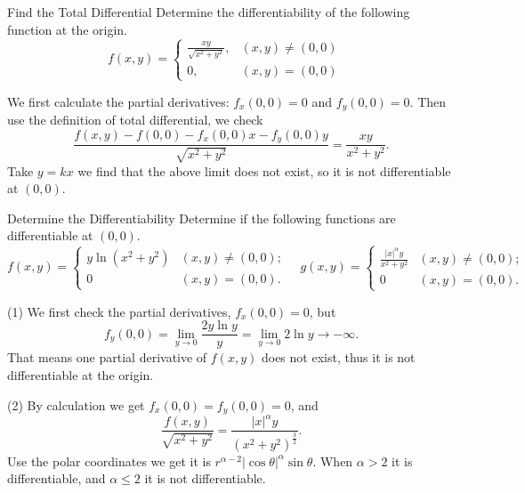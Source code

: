 \begin{example}{Find the Total Differential}{}
  Determine the differentiability of the following function at the origin.
  \begin{equation}
    f(x,y)=\begin{cases}\frac{xy}{\sqrt{x^2+y^2}},&(x,y)\neq(0,0)\\0,&(x,y)=(0,0)\end{cases} \quad
  \end{equation}
\end{example}

\begin{solution}
  We first calculate the partial derivatives: $f_x(0, 0) = 0$ and $f_y(0, 0) = 0$.
  Then use the definition of total differential, we check
  \begin{equation}
    \frac{f(x, y) - f(0, 0) - f_x(0, 0) x - f_y(0, 0)y}{\sqrt{x^2 + y^2}}
    = \frac{xy}{x^2 + y^2}.
  \end{equation}
  Take $y = kx$ we find that the above limit does not exist,
  so it is not differentiable at $(0, 0)$.
\end{solution}

\begin{example}{Determine the Differentiability}{}
  Determine if the following functions are differentiable at $(0, 0)$.
  \begin{equation}
    f(x, y) =
    \begin{cases}
      y \ln (x^2 + y^2) & (x, y) \neq (0, 0);\\
      0 & (x, y) = (0, 0).
    \end{cases}
    \quad
    g(x, y) =
    \begin{cases}
      \frac{|x|^{\alpha} y}{x^2 + y^2} & (x, y) \neq (0, 0);\\
      0 & (x, y) = (0, 0).
    \end{cases}
  \end{equation}
\end{example}

\begin{solution}
  (1) We first check the partial derivatives,
  $f_x(0, 0) = 0$, but
  \begin{equation}
    f_y(0, 0) = \lim \limits _{y \rightarrow 0} \frac{2y\ln y}{y} = \lim \limits _{y \rightarrow 0} 2 \ln y \rightarrow - \infty.
  \end{equation}
  That means one partial derivative of $f(x, y)$ does not exist, thus it is not
  differentiable at the origin.

  (2) By calculation we get $f_x(0, 0) = f_y(0, 0) = 0$, and
  \begin{equation}
    \frac{f(x, y)}{\sqrt{x^2 + y^2}} = \frac{|x|^{\alpha} y}{(x^2 + y^2)^{\frac{3}{2}}}.
  \end{equation}
  Use the polar coordinates we get it is $r^{\alpha - 2}|\cos \theta|^\alpha
  \sin \theta$. When $\alpha > 2$ it is differentiable, and $\alpha \leq 2$ it
  is not differentiable.
\end{solution}

